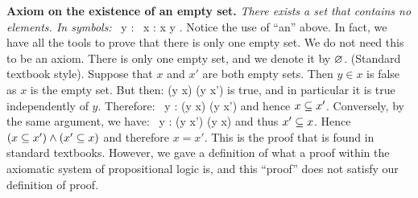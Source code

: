 \textbf{Axiom on the existence of an empty set.} \emph{There exists a set that contains no elements.
In symbols:}
\bse
\exists \, y : \forall \, x : x \notin y .
\ese
Notice the use of ``an'' above.
In fact, we have all the tools to prove that there is only one empty set.
We do not need this to be an axiom.
\bt
There is only one empty set, and we denote it by $\varnothing$.
\et
\bq(Standard textbook style).
Suppose that $x$ and $x'$ are both empty sets.
Then $y\in x$ is false as $x$ is the empty set.
But then:
\bse
 (y \in x) \imp (y \in x')
\ese
is true, and in particular it is true independently of $y$.
Therefore:
\bse
\forall \, y : (y \in x) \imp (y \in x')
\ese
and hence $x \subseteq x'$.
Conversely, by the same argument, we have:
\bse
\forall \, y : (y \in x') \imp (y \in x)
\ese
and thus $x' \subseteq x$.
Hence $(x \subseteq x') \land (x' \subseteq x)$ and therefore $x = x'$.
\eq
This is the proof that is found in standard textbooks.
However, we gave a definition of what a proof within the axiomatic system of propositional logic is, and this ``proof'' does not satisfy our definition of proof.

